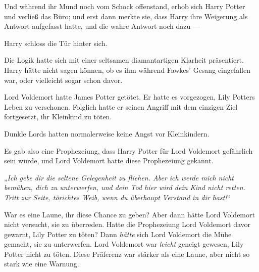 Und während ihr Mund noch vom Schock offenstand, erhob sich Harry Potter und verließ das Büro; und erst dann merkte sie, dass Harry ihre Weigerung als Antwort aufgefasst hatte, und die wahre Antwort noch dazu —

Harry schloss die Tür hinter sich.

Die Logik hatte sich mit einer seltsamen diamantartigen Klarheit präsentiert. Harry hätte nicht sagen können, ob es ihm während Fawkes’ Gesang eingefallen war, oder vielleicht sogar schon davor.

Lord Voldemort hatte James Potter getötet. Er hatte es vorgezogen, Lily Potters Leben zu verschonen. Folglich hatte er seinen Angriff mit dem einzigen Ziel fortgesetzt, ihr Kleinkind zu töten.

Dunkle Lords hatten normalerweise keine Angst vor Kleinkindern.

Es gab also eine Prophezeiung, dass Harry Potter für Lord Voldemort gefährlich sein würde, und Lord Voldemort hatte diese Prophezeiung gekannt.

„\emph{Ich gebe dir die seltene Gelegenheit zu fliehen. Aber ich werde mich nicht bemühen, dich zu unterwerfen, und dein Tod hier wird dein Kind nicht retten. Tritt zur Seite, törichtes Weib, wenn du überhaupt Verstand in dir hast!}“

War es eine Laune, ihr diese Chance zu geben? Aber dann hätte Lord Voldemort nicht versucht, sie zu überreden. Hatte die Prophezeiung Lord Voldemort davor gewarnt, Lily Potter zu töten? Dann \emph{hätte} sich Lord Voldemort die Mühe gemacht, sie zu unterwerfen. Lord Voldemort war \emph{leicht} geneigt gewesen, Lily Potter nicht zu töten. Diese Präferenz war stärker als eine Laune, aber nicht so stark wie eine Warnung.

